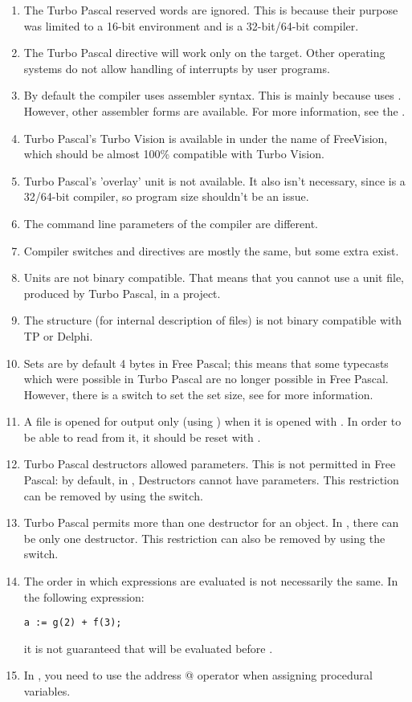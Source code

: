 \begin{enumerate}
\item The Turbo Pascal reserved words  are ignored. 
This is because their purpose was limited to a 16-bit environment 
and \fpc is a 32-bit/64-bit compiler.
\item The Turbo Pascal  directive will work only on the \fpc \dos target.
Other operating systems do not allow handling of interrupts by user
programs.
\item By default the \fpc compiler uses   assembler syntax.
This is mainly because \fpc uses \gnu {}. However, other assembler
forms are available. For more information, see the \progref.
\item Turbo Pascal's Turbo Vision is available in \fpc under the name of 
FreeVision, which should be almost 100\% compatible with Turbo Vision.
\item Turbo Pascal's 'overlay' unit is not available. It also isn't necessary, since
\fpc is a 32/64-bit compiler, so program size shouldn't be an issue.
\item The command line parameters of the compiler are different.
\item Compiler switches and directives are mostly the same, but some extra
exist.
\item Units are not binary compatible. That means that you cannot use a
 unit file, produced by Turbo Pascal, in a \fpc project.
\item The \fpc {} structure (for internal description of files) is not
binary compatible with TP or Delphi.
\item Sets are by default 4 bytes in Free Pascal; this means that some typecasts
which were possible in Turbo Pascal are no longer possible in Free Pascal.
However, there is a switch to set the set size, see \progref for more
information.
\item A file is opened for output only (using ) when it is
opened with . In order to be able to read from it, it should
be reset with .
\item Turbo Pascal destructors allowed parameters. This is not
permitted in Free Pascal: by default, in \fpc, Destructors cannot have parameters. 
This restriction can be removed by using the  switch.
\item Turbo Pascal permits more than one destructor for an object. In \fpc,
there can be only one destructor. This restriction can also be removed by 
using the  switch.
\item The order in which expressions are evaluated is not necessarily the
same. In the following expression:
\begin{verbatim}
a := g(2) + f(3);
\end{verbatim}
it is not guaranteed that  will be evaluated before .
\item In \fpc, you need to use the address @ operator when assigning procedural
variables.
\end{enumerate}

